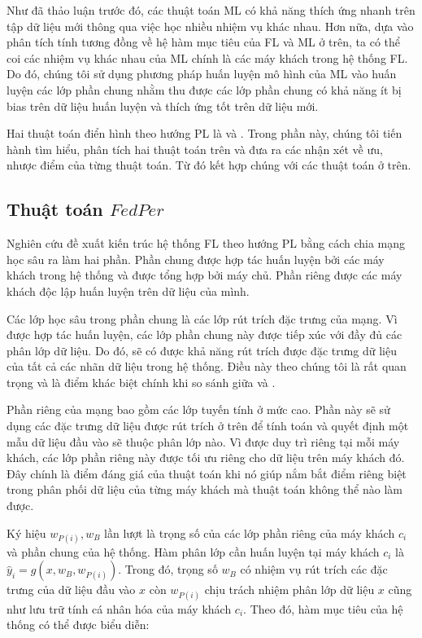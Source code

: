 Như đã thảo luận trước đó, các thuật toán ML có khả năng thích ứng nhanh trên tập dữ liệu mới thông qua việc học nhiều nhiệm vụ khác nhau. Hơn nữa, dựa vào phân tích tính tương đồng về hệ hàm mục tiêu của FL và ML ở trên, ta có thể coi các nhiệm vụ khác nhau của ML chính là các máy khách trong hệ thống FL. Do đó, chúng tôi sử dụng phương pháp huấn luyện mô hình của ML vào huấn luyện các lớp phần chung nhằm thu được các lớp phần chung có khả năng ít bị bias trên dữ liệu huấn luyện và thích ứng tốt trên dữ liệu mới.

Hai thuật toán điển hình theo hướng PL là  \cite{arivazhagan2019federated} và  \cite{liang2020think}. Trong phần này, chúng tôi tiến hành tìm hiểu, phân tích hai thuật toán trên và đưa ra các nhận xét về ưu, nhược điểm của từng thuật toán. Từ đó kết hợp chúng với các thuật toán  ở trên.

\subsection{Thuật toán $FedPer$}


Nghiên cứu \cite{arivazhagan2019federated} đề xuất kiến trúc hệ thống FL theo hướng PL bằng cách chia mạng học sâu ra làm hai phần. Phần chung được hợp tác huấn luyện bởi các máy khách trong hệ thống và được tổng hợp bởi máy chủ. Phần riêng được các máy khách độc lập huấn luyện trên dữ liệu của mình.

Các lớp học sâu trong phần chung là các lớp rút trích đặc trưng của mạng. Vì được hợp tác huấn luyện, các lớp phần chung này được tiếp xúc với đầy đủ các phân lớp dữ liệu. Do đó, sẽ có được khả năng rút trích được đặc trưng dữ liệu của tất cả các nhãn dữ liệu trong hệ thống. Điều này theo chúng tôi là rất quan trọng và là điểm khác biệt chính khi so sánh giữa  và .

Phần riêng của mạng bao gồm các lớp tuyến tính ở mức cao. Phần này sẽ sử dụng các đặc trưng dữ liệu được rút trích ở trên để tính toán và quyết định một mẫu dữ liệu đầu vào sẽ thuộc phân lớp nào. Vì được duy trì riêng tại mỗi máy khách, các lớp phần riêng này được tối ưu riêng cho dữ liệu trên máy khách đó. Đây chính là điểm đáng giá của thuật toán  khi nó giúp nắm bắt điểm riêng biệt trong phân phối dữ liệu của từng máy khách mà thuật toán  không thể nào làm được.

Ký hiệu $w_{P(i)}, w_B$ lần lượt là trọng số của các lớp phần riêng của máy khách $c_i$ và phần chung của hệ thống. Hàm phân lớp cần huấn luyện tại máy khách $c_i$ là $\hat{y}_i = g(x, w_B, w_{P(i)})$. Trong đó, trọng số $w_B$ có nhiệm vụ rút trích các đặc trưng của dữ liệu đầu vào $x$ còn $w_{P(i)}$ chịu trách nhiệm phân lớp dữ liệu $x$ cũng như lưu trữ tính cá nhân hóa của máy khách $c_i$. Theo đó, hàm mục tiêu của hệ thống có thể được biểu diễn:

